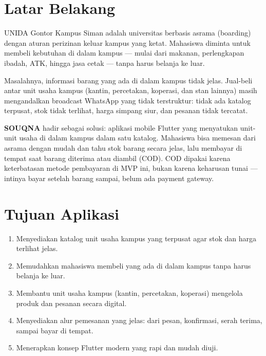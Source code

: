 \documentclass[11pt, a4paper]{article}
\begin{document}
 \null

\clearpage

\section{Latar Belakang}

UNIDA Gontor Kampus Siman adalah universitas berbasis asrama (boarding) dengan aturan perizinan keluar kampus yang ketat. Mahasiswa diminta untuk membeli kebutuhan di dalam kampus --- mulai dari makanan, perlengkapan ibadah, ATK, hingga jasa cetak --- tanpa harus belanja ke luar.

Masalahnya, informasi barang yang ada di dalam kampus tidak jelas. Jual-beli antar unit usaha kampus (kantin, percetakan, koperasi, dan stan lainnya) masih mengandalkan broadcast WhatsApp yang tidak terstruktur: tidak ada katalog terpusat, stok tidak terlihat, harga simpang siur, dan pesanan tidak tercatat.

\textbf{SOUQNA} hadir sebagai solusi: aplikasi mobile Flutter yang menyatukan unit-unit usaha di dalam kampus dalam satu katalog. Mahasiswa bisa memesan dari asrama dengan mudah dan tahu stok barang secara jelas, lalu membayar di tempat saat barang diterima atau diambil (COD). COD dipakai karena keterbatasan metode pembayaran di MVP ini, bukan karena keharusan tunai --- intinya bayar setelah barang sampai, belum ada payment gateway.

\section{Tujuan Aplikasi}

\begin{enumerate}
  \item Menyediakan katalog unit usaha kampus yang terpusat agar stok dan harga terlihat jelas.
  \item Memudahkan mahasiswa membeli yang ada di dalam kampus tanpa harus belanja ke luar.
  \item Membantu unit usaha kampus (kantin, percetakan, koperasi) mengelola produk dan pesanan secara digital.
  \item Menyediakan alur pemesanan yang jelas: dari pesan, konfirmasi, serah terima, sampai bayar di tempat.
  \item Menerapkan konsep Flutter modern yang rapi dan mudah diuji.
\end{enumerate}
\end{document}
